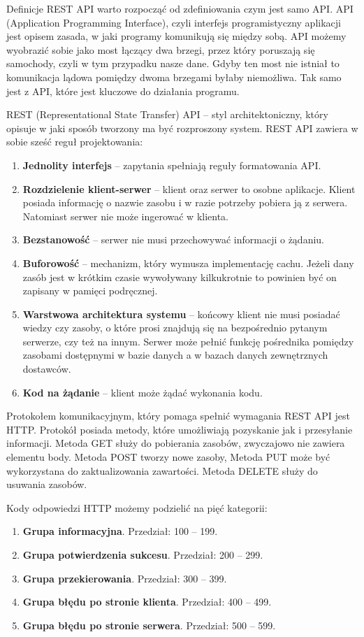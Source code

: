 \documentclass[a4paper,twoside,12pt]{book}
\begin{document}
Definicje REST API warto rozpocząć od zdefiniowania czym jest samo API.  
API (Application Programming Interface), czyli interfejs programistyczny aplikacji jest opisem zasada, w jaki programy komunikują się między sobą. API możemy wyobrazić sobie jako most łączący dwa brzegi, przez który poruszają się samochody, czyli w tym przypadku nasze dane. Gdyby ten most nie istniał to komunikacja lądowa pomiędzy dwoma brzegami byłaby niemożliwa. Tak samo jest z API, które jest kluczowe do działania programu.  

REST (Representational State Transfer) API – styl architektoniczny, który opisuje w jaki sposób tworzony ma być rozproszony system. REST API zawiera w sobie sześć reguł projektowania: 
\begin{enumerate}
    \item \textbf{Jednolity interfejs} -- zapytania spełniają reguły formatowania API.
    \item \textbf{Rozdzielenie klient-serwer} -- klient oraz serwer to osobne aplikacje. Klient posiada informację o nazwie zasobu i w razie potrzeby pobiera ją z serwera. Natomiast serwer nie może ingerować w klienta. 
    \item \textbf{Bezstanowość} -- serwer nie musi przechowywać informacji o żądaniu.
    \item \textbf{Buforowość} -- mechanizm, który wymusza implementację cachu. Jeżeli dany zasób jest w krótkim czasie wywoływany kilkukrotnie to powinien być on zapisany w pamięci podręcznej. 
    \item \textbf{Warstwowa architektura systemu} -- końcowy klient nie musi posiadać wiedzy czy zasoby, o które prosi znajdują się na bezpośrednio pytanym serwerze, czy też na innym. Serwer może pełnić funkcję pośrednika pomiędzy zasobami dostępnymi w bazie danych a w bazach danych zewnętrznych dostawców. 
    \item \textbf{Kod na żądanie} -- klient może żądać wykonania kodu.
\end{enumerate}

Protokołem komunikacyjnym, który pomaga spełnić wymagania REST API jest HTTP. Protokół posiada metody, które umożliwiają pozyskanie jak i przesyłanie informacji. Metoda GET służy do pobierania zasobów, zwyczajowo nie zawiera elementu body. Metoda POST tworzy nowe zasoby, Metoda PUT może być wykorzystana do zaktualizowania zawartości. Metoda DELETE służy do usuwania zasobów.  

Kody odpowiedzi HTTP możemy podzielić na pięć kategorii: 
\begin{enumerate}
    \item \textbf{Grupa informacyjna}. Przedział: 100 – 199.
    \item \textbf{Grupa potwierdzenia sukcesu}. Przedział: 200 – 299.
    \item \textbf{Grupa przekierowania}. Przedział: 300 – 399.
    \item \textbf{Grupa błędu po stronie klienta}. Przedział: 400 – 499.
    \item \textbf{Grupa błędu po stronie serwera}. Przedział: 500 – 599.
\end{enumerate}
\end{document}
